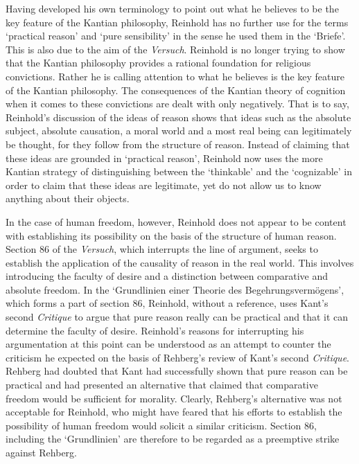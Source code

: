  Having developed his own terminology to point out what he believes to be the key feature of the Kantian philosophy, Reinhold has no further use for the terms `practical reason' and `pure sensibility' in the sense he used them in the `Briefe'. This is also due to the aim of the \textit{Versuch}. Reinhold is no longer trying to show that the Kantian philosophy provides a rational foundation for religious convictions. Rather he is calling attention to what he believes is the key feature of the Kantian philosophy. The consequences of the Kantian theory of cognition when it comes to these convictions are dealt with only negatively. That is to say, Reinhold's discussion of the ideas of reason shows that ideas such as the absolute subject, absolute causation, a moral world and a most real being can legitimately be thought, for they follow from the structure of reason. Instead of claiming that these ideas are grounded in `practical reason', Reinhold now uses the more Kantian strategy of distinguishing between the `thinkable' and the `cognizable' in order to claim that these ideas are legitimate, yet do not allow us to know anything about their objects. 

 In the case of human freedom, however, Reinhold does not appear to be content with establishing its possibility on the basis of the structure of human reason. Section 86 of the \textit{Versuch}, which interrupts the line of argument, seeks to establish the application of the causality of reason in the real world. This involves introducing the faculty of desire and a distinction between comparative and absolute freedom. In the `Grundlinien einer Theorie des Begehrungsverm\"{o}gens', which forms a part of section 86, Reinhold, without a reference, uses Kant's second \textit{Critique} to argue that pure reason really can be practical and that it can determine the faculty of desire. Reinhold's reasons for interrupting his argumentation at this point can be understood as an attempt to counter the criticism he expected on the basis of Rehberg's review of Kant's second \textit{Critique}. Rehberg had doubted that Kant had successfully shown that pure reason can be practical and had presented an alternative that claimed that comparative freedom would be sufficient for morality. Clearly, Rehberg's alternative was not acceptable for Reinhold, who might have feared that his efforts to establish the possibility of human freedom would solicit a similar criticism. Section 86, including the `Grundlinien' are therefore to be regarded as a preemptive strike against Rehberg. 

